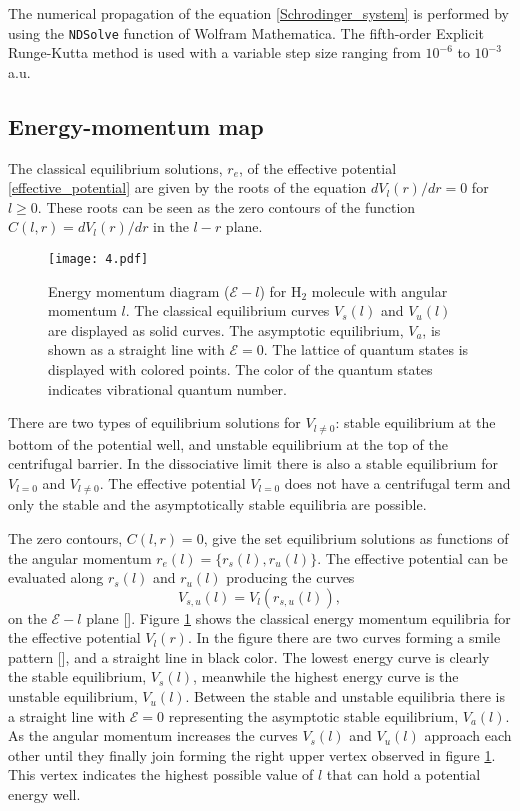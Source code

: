 \documentclass[%
 aip,
 numerical,
 jcp,
 floatfix,
rsi,%
amsmath,amssymb,
reprint,%
author-year%
]{revtex4-1}
\begin{document}
The numerical propagation of the equation \eqref{Schrodinger_system} is performed by using the \verb|NDSolve| function of Wolfram Mathematica. The fifth-order Explicit Runge-Kutta method is used with a variable step size ranging from $10^{-6}$ to $10^{-3}$ a.u.

\subsection{Energy-momentum map}

The classical equilibrium solutions, $r_e$, of the effective potential \eqref{effective_potential} are given by the roots of the equation $dV_l(r)/dr=0$ for $l\ge 0$. These roots can be seen as the zero contours of the function $C(l,r)=dV_l(r)/dr$ in the $l-r$ plane. 
\\
\begin{figure}[ht!]\centering
\texttt{[image: 4.pdf]}
\caption{Energy momentum diagram ($\mathcal{E}-l$) for H$_2$ molecule with angular momentum $l$. The classical equilibrium curves $V_s(l)$ and $V_u(l)$ are displayed as solid curves. The asymptotic equilibrium, $V_a$, is shown as a straight line with $\mathcal{E}=0$. The lattice of quantum states is displayed with colored points. The color of the quantum states indicates vibrational quantum number.} \label{energy_momentum}
\end{figure}

There are two types of equilibrium solutions for $V_{l\ne0}$: stable equilibrium at the bottom of the potential well, and unstable  equilibrium at the top of the centrifugal barrier. In the dissociative limit there is also a stable equilibrium for $V_{l=0}$ and $V_{l\ne0}$. The effective potential $V_{l=0}$ does not have a centrifugal term and only the stable and the asymptotically stable equilibria are possible.  

The zero contours, $C(l,r)=0$, give the set equilibrium solutions as functions of the angular momentum $r_e(l)=\{r_{s}(l),r_{u}(l)\}$. The effective potential can be evaluated along $r_s(l)$ and $r_u(l)$ producing the curves 
\begin{equation}\label{stable_unstable_curves}
    V_{s,u}(l)=V_l(r_{s,u}(l)),
\end{equation}
on the $\mathcal{E}-l$ plane []. Figure \ref{energy_momentum} shows the classical energy momentum equilibria for the effective potential $V_l(r)$. In the figure there are two curves forming a smile pattern [], and a straight line in black color. The lowest energy curve is clearly the stable equilibrium, $V_s(l)$, meanwhile the highest energy curve is the unstable equilibrium, $V_u(l)$. Between the stable and unstable equilibria there is a straight line with $\mathcal{E}=0$ representing the asymptotic stable equilibrium, $V_a(l)$. As the angular momentum increases the curves $V_s(l)$ and $V_u(l)$ approach each other until they finally join forming the right upper vertex observed in figure \ref{energy_momentum}. This vertex indicates the highest possible value of $l$ that can hold a potential energy well. 
\end{document}

